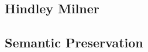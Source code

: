 \documentclass[runningheads]{llncs}
\begin{document}
\subsection{Hindley Milner}
\subsection{Semantic Preservation}

\begin{thebibliography}{8}



\end{thebibliography}
\end{document}
